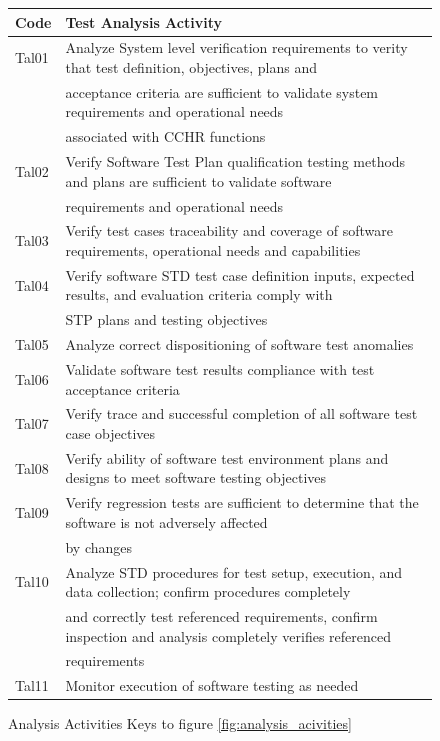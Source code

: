 \documentclass[twocolumn]{styles/IEEEtran}
\begin{document}
\begin{figure}[h]
\begin{tiny}
\begin{center}
\begin{tabular}[t]{|l@{ }|l@{ }|}
Code 	& Test Analysis Activity	\\  \hline
Tal01	&Analyze System level verification requirements to verity that test definition, objectives, plans and  \\
	& acceptance criteria are sufficient to validate system requirements and operational needs  \\
	& associated with CCHR functions \\
Tal02	&Verify Software Test Plan qualification testing methods and plans are sufficient to validate software \\
	&  requirements and operational needs \\
Tal03	&Verify test cases traceability and coverage of software requirements, operational needs and capabilities \\
Tal04	&Verify software STD test case definition inputs, expected results, and evaluation criteria comply with \\ 
	& STP plans and testing objectives \\
Tal05	&Analyze correct dispositioning of software test anomalies \\
Tal06	&Validate software test results compliance with test acceptance criteria \\
Tal07	&Verify trace and successful completion of all software test case objectives \\
Tal08	&Verify ability of software test environment plans and designs to meet software testing objectives \\
Tal09	&Verify regression tests are sufficient to determine that the software is not adversely affected \\
	& by changes \\
Tal10	&Analyze STD procedures for test setup, execution, and data collection; confirm procedures completely  \\
	& and correctly test referenced requirements, confirm inspection and analysis completely verifies referenced  \\
	& requirements \\
Tal11	&Monitor execution of software testing as needed \\ \hline

 \end{tabular}
 \end{center}
 \end{tiny}
 \caption{Analysis Activities Keys to figure \ref{fig:analysis_acivities}}
 \label{fig:analysis_acivities_key}
 
\end{figure}
\end{document}
